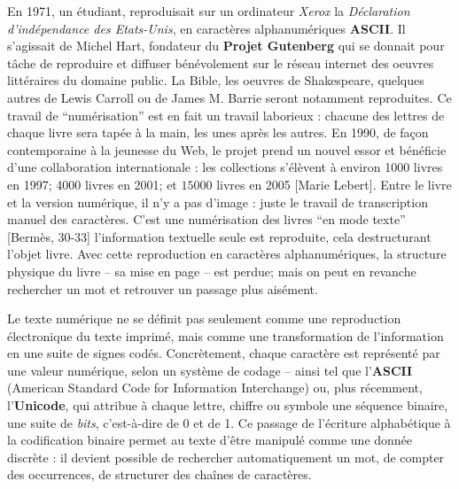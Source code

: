 En 1971, un étudiant, reproduisait sur un ordinateur \emph{Xerox} la \emph{Déclaration d'indépendance des Etats-Unis}, en caractères alphanumériques \textbf{ASCII}. Il s'agissait de Michel Hart, fondateur du \textbf{Projet Gutenberg} qui se donnait pour tâche de reproduire et diffuser bénévolement sur le réseau internet des oeuvres littéraires du domaine public. La Bible, les oeuvres de Shakespeare, quelques autres de Lewis Carroll ou de James M. Barrie seront notamment reproduites. Ce travail de \enquote{numérisation} est en fait un travail laborieux : chacune des lettres de chaque livre sera tapée à la main, les unes après les autres. En 1990, de façon contemporaine à la jeunesse du Web, le projet prend un nouvel essor et bénéficie d'une collaboration internationale : les collections s'élèvent à environ 1000 livres en 1997; 4000 livres en 2001; et $15000$ livres en 2005 [Marie Lebert]. Entre le livre et la version numérique, il n'y a pas d'image : juste le travail de transcription manuel des caractères. C'est une numérisation des livres \enquote{en mode texte} [Bermès, 30-33] l'information textuelle seule est reproduite, cela destructurant l'objet livre. Avec cette reproduction en caractères alphanumériques, la structure physique du livre -- sa mise en page -- est perdue; mais on peut en revanche rechercher un mot et retrouver un passage plus aisément. 

Le texte numérique ne se définit pas seulement comme une reproduction électronique du texte imprimé, mais comme une transformation de l’information en une suite de signes codés. Concrètement, chaque caractère est représenté par une valeur numérique, selon un système de codage -- ainsi tel que l’\textbf{ASCII} (American Standard Code for Information Interchange) ou, plus récemment, l’\textbf{Unicode}, qui attribue à chaque lettre, chiffre ou symbole une séquence binaire, une suite de \emph{bits}, c’est-à-dire de 0 et de 1. Ce passage de l’écriture alphabétique à la codification binaire permet au texte d’être manipulé comme une donnée discrète : il devient possible de rechercher automatiquement un mot, de compter des occurrences, de structurer des chaînes de caractères.

